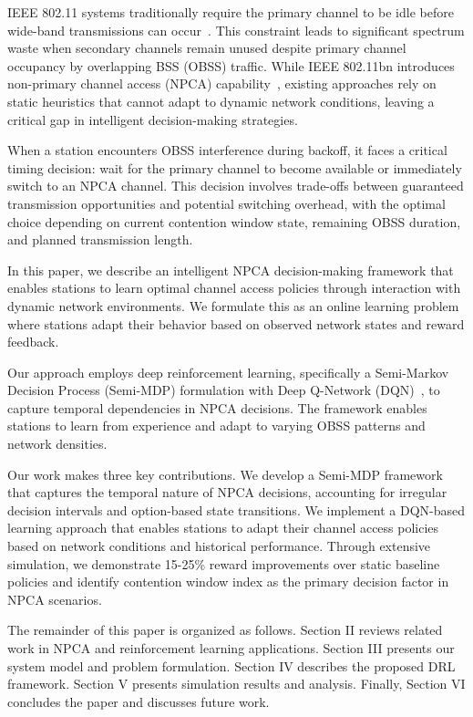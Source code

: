 \documentclass[conference]{IEEEtran}
\begin{document}
IEEE 802.11 systems traditionally require the primary channel to be idle before wide-band transmissions can occur~\cite{wei2024non}. This constraint leads to significant spectrum waste when secondary channels remain unused despite primary channel occupancy by overlapping BSS (OBSS) traffic. While IEEE 802.11bn introduces non-primary channel access (NPCA) capability~\cite{bellalta2025performance}, existing approaches rely on static heuristics that cannot adapt to dynamic network conditions, leaving a critical gap in intelligent decision-making strategies.

When a station encounters OBSS interference during backoff, it faces a critical timing decision: wait for the primary channel to become available or immediately switch to an NPCA channel. This decision involves trade-offs between guaranteed transmission opportunities and potential switching overhead, with the optimal choice depending on current contention window state, remaining OBSS duration, and planned transmission length. 

In this paper, we describe an intelligent NPCA decision-making framework that enables stations to learn optimal channel access policies through interaction with dynamic network environments. We formulate this as an online learning problem where stations adapt their behavior based on observed network states and reward feedback.

Our approach employs deep reinforcement learning, specifically a Semi-Markov Decision Process (Semi-MDP) formulation with Deep Q-Network (DQN)~\cite{mnih2013playing, mnih2015human}, to capture temporal dependencies in NPCA decisions. The framework enables stations to learn from experience and adapt to varying OBSS patterns and network densities.

Our work makes three key contributions. We develop a Semi-MDP framework that captures the temporal nature of NPCA decisions, accounting for irregular decision intervals and option-based state transitions. We implement a DQN-based learning approach that enables stations to adapt their channel access policies based on network conditions and historical performance. Through extensive simulation, we demonstrate 15-25\% reward improvements over static baseline policies and identify contention window index as the primary decision factor in NPCA scenarios.

The remainder of this paper is organized as follows. Section II reviews related work in NPCA and reinforcement learning applications. Section III presents our system model and problem formulation. Section IV describes the proposed DRL framework. Section V presents simulation results and analysis. Finally, Section VI concludes the paper and discusses future work.
\end{document}
